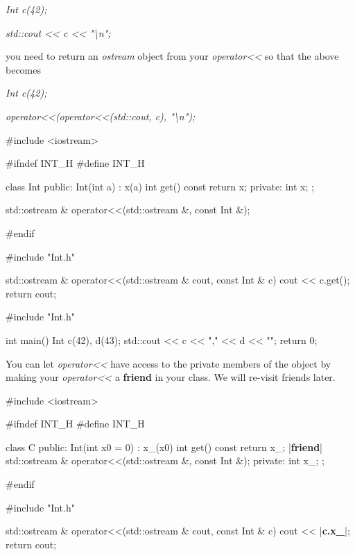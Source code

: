 \textit{Int c(42);}

\textit{std::cout << c << "\textbackslash n";}

you need to return an \textit{ostream} object from your
\textit{operator<<} so that the above becomes

\textit{Int c(42);}

\textit{operator<<(operator<<(std::cout, c), "\textbackslash n");}

\begin{consolethree}[escapeinside=||]
#include <iostream>

#ifndef INT_H
#define INT_H

class Int
{
public:
    Int(int a)
        : x(a)
    {}
    int get() const { return x; }
private:
    int x;
};

std::ostream & operator<<(std::ostream &, const Int &);

#endif
\end{consolethree}

\begin{consolethree}[escapeinside=||]
#include "Int.h"

std::ostream & operator<<(std::ostream & cout, const Int & c) {
    cout << c.get();
    return cout;
}
\end{consolethree}

\begin{consolethree}[escapeinside=||]
#include "Int.h"

int main()
{
    Int c(42), d(43);
    std::cout << c << "," << d << "\n";
    return 0;
}
\end{consolethree}


\newpage{}

You can let \textit{operator<<} have access to the
private members of the object by making your
\textit{operator<<} a \textbf{friend} in your class. We
will re-visit friends later.

\begin{consolethree}[escapeinside=||]
#include <iostream>

#ifndef INT_H
#define INT_H

class C
{
public:
    Int(int x0 = 0)
        : x_(x0)
    {}
    int get() const { return x_; }
    |{\bf friend}| std::ostream & operator<<(std::ostream &, const Int &);
private:
    int x_;
};

#endif
\end{consolethree}

\begin{consolethree}[escapeinside=||]
#include "Int.h"

std::ostream & operator<<(std::ostream & cout, const Int & c)
{
    cout << |{\bf c.x\_}|;
    return cout;
}
\end{consolethree}

